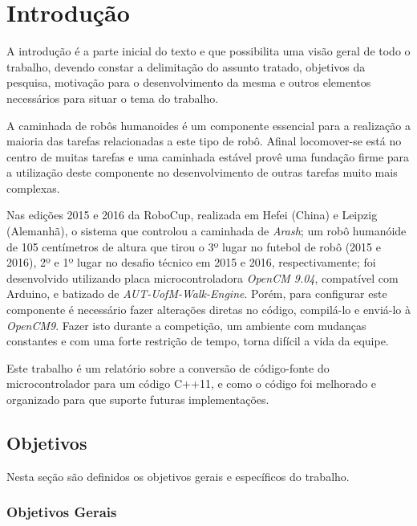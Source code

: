 \chapter{Introdução}

A introdução é a parte inicial do texto e que possibilita uma visão geral de
todo o trabalho, devendo constar a delimitação do assunto tratado, objetivos da
pesquisa, motivação para o desenvolvimento da mesma e outros elementos
necessários para situar o tema do trabalho.







A caminhada de robôs humanoides é um componente essencial para a realização a maioria das tarefas relacionadas a este tipo de robô. Afinal locomover-se está no centro de muitas tarefas e uma caminhada estável provê uma fundação firme para a utilização deste componente no desenvolvimento de outras tarefas muito mais complexas.

Nas edições 2015 e 2016 da RoboCup, realizada em Hefei (China) e Leipzig (Alemanhã), o sistema que controlou a caminhada de \textit{Arash}; um robô humanóide de 105 centímetros de altura que tirou o 3º lugar no futebol de robô (2015 e 2016), 2º e 1º lugar no desafio técnico em 2015 e 2016, respectivamente; foi desenvolvido utilizando placa microcontroladora \textit{OpenCM 9.04}, compatível com Arduino, e batizado de \textit{AUT-UofM-Walk-Engine}. Porém, para configurar este componente é necessário fazer alterações diretas no código, compilá-lo e enviá-lo à \textit{OpenCM9}. Fazer isto durante a competição, um ambiente com mudanças constantes e com uma forte restrição de tempo, torna difícil a vida da equipe.

Este trabalho é um relatório sobre a conversão de código-fonte do microcontrolador para um código C++11, e como o código foi melhorado e organizado para que suporte futuras implementações.










\section{Objetivos}

Nesta seção são definidos os objetivos gerais e específicos do trabalho.

\subsection{Objetivos Gerais}

